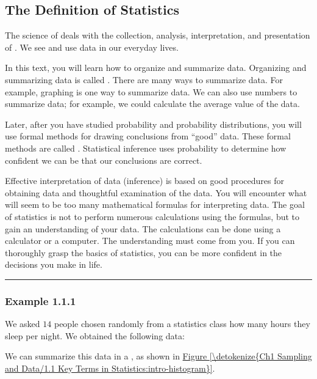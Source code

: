 \documentclass[letterpaper,10pt,english]{jupyterBook}
\begin{document}
\subsection{The Definition of Statistics}
\label{\detokenize{Ch1 Sampling and Data/1.1 Key Terms in Statistics:the-definition-of-statistics}}
\sphinxAtStartPar
The science of  deals with the collection, analysis, interpretation, and presentation of . We see and use data in our everyday lives.

\sphinxAtStartPar
In this text, you will learn how to organize and summarize data. Organizing and summarizing data is called . There are many ways to summarize data. For example, graphing is one way to summarize data. We can also use numbers to summarize data; for example, we could calculate the average value of the data.

\sphinxAtStartPar
Later, after you have studied probability and probability distributions, you will use formal methods for drawing conclusions from “good” data. These formal methods are called . Statistical inference uses probability to determine how confident we can be that our conclusions are correct.

\sphinxAtStartPar
Effective interpretation of data (inference) is based on good procedures for obtaining data and thoughtful examination of the data. You will encounter what will seem to be too many mathematical formulas for interpreting data. The goal of statistics is not to perform numerous calculations using the formulas, but to gain an understanding of your data. The calculations can be done using a calculator or a computer. The understanding must come from you. If you can thoroughly grasp the basics of statistics, you can be more confident in the decisions you make in life.


\bigskip\hrule\bigskip



\subsubsection{Example 1.1.1}
\label{\detokenize{Ch1 Sampling and Data/1.1 Key Terms in Statistics:example-1-1-1}}
\sphinxAtStartPar
We asked \(14\) people chosen randomly from a statistics class how many hours they sleep per night. We obtained the following data:



\sphinxAtStartPar
We can summarize this data in a , as shown in \hyperref[\detokenize{Ch1 Sampling and Data/1.1 Key Terms in Statistics:intro-histogram}]{Figure \ref{\detokenize{Ch1 Sampling and Data/1.1 Key Terms in Statistics:intro-histogram}}}.
\end{document}
